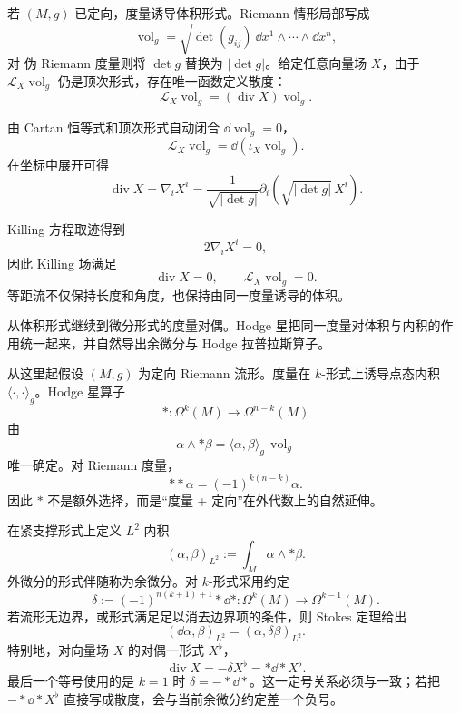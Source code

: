 若 $(M,g)$ 已定向，度量诱导体积形式。Riemann 情形局部写成
\begin{equation*}\operatorname{vol}_g
=\sqrt{\det(g_{ij})}\,
\dd x^1\wedge\cdots\wedge\dd x^n,
\end{equation*}
对 伪 Riemann 度量则将 $\det g$ 替换为 $|\det g|$。给定任意向量场 $X$，由于 $\mathcal L_X\operatorname{vol}_g$ 仍是顶次形式，存在唯一函数定义散度：
\begin{equation}\label{eq:math-dg-divergence-volume}
\mathcal L_X\operatorname{vol}_g=(\operatorname{div} X)\operatorname{vol}_g.
\end{equation}

由 Cartan 恒等式和顶次形式自动闭合 $\dd\operatorname{vol}_g=0$，
\[
\mathcal L_X\operatorname{vol}_g=\dd(\iota_{X}\operatorname{vol}_g).
\]
在坐标中展开可得
\begin{equation*}\boxed{
\operatorname{div} X
=\nabla_iX^i
=\frac{1}{\sqrt{|\det g|}}
\partial_i\!\left(\sqrt{|\det g|}\,X^i\right).}
\end{equation*}

Killing 方程取迹得到
\[
2\nabla_iX^i=0,
\]
因此 Killing 场满足
\begin{equation*}\operatorname{div} X=0,
\qquad
\mathcal L_X\operatorname{vol}_g=0.
\end{equation*}
等距流不仅保持长度和角度，也保持由同一度量诱导的体积。

从体积形式继续到微分形式的度量对偶。Hodge 星把同一度量对体积与内积的作用统一起来，并自然导出余微分与 Hodge 拉普拉斯算子。

从这里起假设 $(M,g)$ 为定向 Riemann 流形。度量在 $k$-形式上诱导点态内积 $\langle\cdot,\cdot\rangle_g$。Hodge 星算子
\begin{equation*}*:\Omega^k(M)\to\Omega^{n-k}(M)
\end{equation*}
由
\begin{equation}\label{eq:math-dg-hodge-star-characterization}
\alpha\wedge *\beta
=\langle\alpha,\beta\rangle_g\,\operatorname{vol}_g
\end{equation}
唯一确定。对 Riemann 度量，
\[
**\alpha=(-1)^{k(n-k)}\alpha.
\]
因此 $*$ 不是额外选择，而是“度量 + 定向”在外代数上的自然延伸。

在紧支撑形式上定义 $L^2$ 内积
\[
(\alpha,\beta)_{L^2}
:=\int_M\alpha\wedge *\beta.
\]
外微分的形式伴随称为余微分。对 $k$-形式采用约定
\begin{equation*}\delta
:=(-1)^{n(k+1)+1}*\dd*:
\Omega^k(M)\to\Omega^{k-1}(M).
\end{equation*}
若流形无边界，或形式满足足以消去边界项的条件，则 Stokes 定理给出
\[
(\dd\alpha,\beta)_{L^2}
=(\alpha,\delta\beta)_{L^2}.
\]
特别地，对向量场 $X$ 的对偶一形式 $X^\flat$，
\begin{equation*}\boxed{\operatorname{div} X=-\delta X^\flat=*\dd*X^\flat.}
\end{equation*}
最后一个等号使用的是 $k=1$ 时 $\delta=-*\dd*$。这一定号关系必须与一致；若把 $-*\dd*X^\flat$ 直接写成散度，会与当前余微分约定差一个负号。

